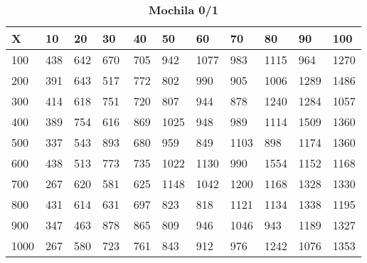 \documentclass[10pt,letterpaper]{article}
\begin{document}
\newpage 
{}
\begin{center}
\begin{table}\renewcommand{\arraystretch}{2.5}
\caption{\large \textbf{Mochila 0/1}}
\centering
\begin{tabular} { |m{0.5cm}|m{1.3cm}|m{1.3cm}|m{1.3cm}|m{1.3cm}|m{1.3cm}|m{1.3cm}|m{1.3cm}|m{1.3cm}|m{1.3cm}|m{1.3cm}|} 
\hline
\rowcolor{Gray}
\centering \textbf{X} & \centering \textbf{10} & \centering \textbf{20} & \centering \textbf{30}\ & \centering \textbf{40} & \centering \textbf{50} & \centering \textbf{60}\ & \centering \textbf{70} & \centering \textbf{80} & \centering \textbf{90}\ & \textbf{100} \\\hline
\cellcolor{Gray}100 & \Large 438 & \Large 642 & \Large 670 & \Large 705 & \Large 942 & \Large 1077 & \Large 983 & \Large 1115 & \Large 964 & \Large 1270 \\
\hline
\cellcolor{Gray}200 & \Large 391 & \Large 643 & \Large 517 & \Large 772 & \Large 802 & \Large 990 & \Large 905 & \Large 1006 & \Large 1289 & \Large 1486 \\
\hline
\cellcolor{Gray}300 & \Large 414 & \Large 618 & \Large 751 & \Large 720 & \Large 807 & \Large 944 & \Large 878 & \Large 1240 & \Large 1284 & \Large 1057 \\
\hline
\cellcolor{Gray}400 & \Large 389 & \Large 754 & \Large 616 & \Large 869 & \Large 1025 & \Large 948 & \Large 989 & \Large 1114 & \Large 1509 & \Large 1360 \\
\hline
\cellcolor{Gray}500 & \Large 337 & \Large 543 & \Large 893 & \Large 680 & \Large 959 & \Large 849 & \Large 1103 & \Large 898 & \Large 1174 & \Large 1360 \\
\hline
\cellcolor{Gray}600 & \Large 438 & \Large 513 & \Large 773 & \Large 735 & \Large 1022 & \Large 1130 & \Large 990 & \Large 1554 & \Large 1152 & \Large 1168 \\
\hline
\cellcolor{Gray}700 & \Large 267 & \Large 620 & \Large 581 & \Large 625 & \Large 1148 & \Large 1042 & \Large 1200 & \Large 1168 & \Large 1328 & \Large 1330 \\
\hline
\cellcolor{Gray}800 & \Large 431 & \Large 614 & \Large 631 & \Large 697 & \Large 823 & \Large 818 & \Large 1121 & \Large 1134 & \Large 1338 & \Large 1195 \\
\hline
\cellcolor{Gray}900 & \Large 347 & \Large 463 & \Large 878 & \Large 865 & \Large 809 & \Large 946 & \Large 1046 & \Large 943 & \Large 1189 & \Large 1327 \\
\hline
\cellcolor{Gray}1000 & \Large 267 & \Large 580 & \Large 723 & \Large 761 & \Large 843 & \Large 912 & \Large 976 & \Large 1242 & \Large 1076 & \Large 1353 \\
\hline
\end{tabular} \\
\end{table}
\end{center}
\end{document}
